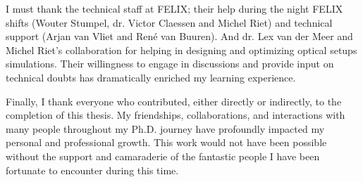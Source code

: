 I must thank the technical staff at FELIX; their help during the night FELIX shifts (Wouter Stumpel, dr. Victor Claessen and Michel Riet) and technical support (Arjan van Vliet and Ren\'{e} van Buuren). And dr. Lex van der Meer and Michel Riet's collaboration for helping in designing and optimizing optical setups simulations. Their willingness to engage in discussions and provide input on technical doubts has dramatically enriched my learning experience.

Finally, I thank everyone who contributed, either directly or indirectly, to the completion of this thesis. My friendships, collaborations, and interactions with many people throughout my Ph.D. journey have profoundly impacted my personal and professional growth. This work would not have been possible without the support and camaraderie of the fantastic people I have been fortunate to encounter during this time.